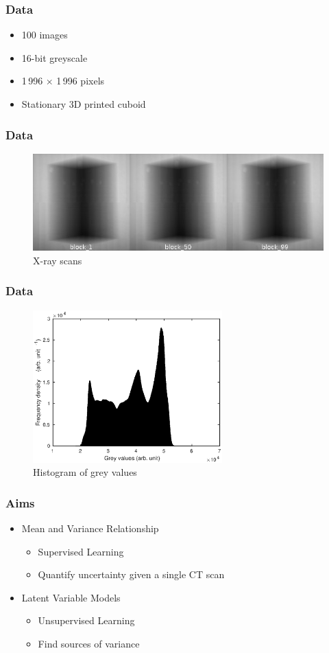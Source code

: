 \documentclass{beamer}
\begin{document}
\begin{frame}
\frametitle{Data}
\begin{itemize}
	\item 100 images
	\item 16-bit greyscale
	\item 1\,996 $\times$ 1\,996 pixels
	\item Stationary 3D printed cuboid
\end{itemize}
\end{frame}

\begin{frame}
\frametitle{Data}
\begin{figure}
	\includegraphics[width = \textwidth]{figures/block_montage.jpg}
	\caption{X-ray scans}
\end{figure}
\end{frame}

\begin{frame}
\frametitle{Data}
\begin{figure}
	\includegraphics[width = 0.65\textwidth]{figures/block_histogram.eps}
	\caption{Histogram of grey values}
\end{figure}
\end{frame}

\begin{frame}
\frametitle{Aims}
\begin{itemize}
	\item Mean and Variance Relationship
		\begin{itemize}
			\item Supervised Learning
			\item Quantify uncertainty given a single CT scan
		\end{itemize}
	\pause
	\item Latent Variable Models
		\begin{itemize}
			\item Unsupervised Learning
			\item Find sources of variance
		\end{itemize}
\end{itemize}
\end{frame}
\end{document}
